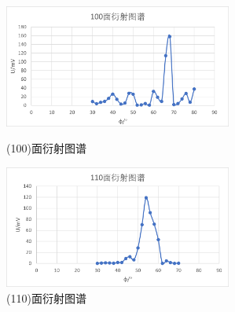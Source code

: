 \documentclass[11pt]{article}
\begin{document}
\begin{figure}[H]
    \begin{minipage}[t]{0.49\linewidth}
        \centering
        \includegraphics[width=7.5cm]{Fig/8.png}
        \caption{(100)面衍射图谱}
    \end{minipage}
    \begin{minipage}[t]{0.49\linewidth}
        \centering
        \includegraphics[width=7.5cm]{Fig/9.png}
        \caption{(110)面衍射图谱}
    \end{minipage}
\end{figure}
\end{document}
